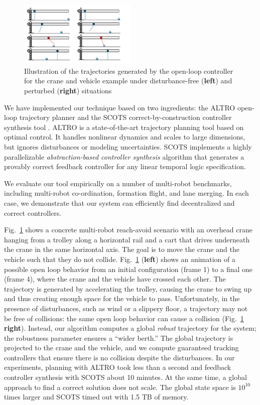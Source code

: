 \begin{figure}[t]
	\centering
	\includegraphics[width=0.5\textwidth]{figures/crane_and_forklifter.pdf}
	\caption{Illustration of the trajectories generated by the open-loop controller for the crane and vehicle example under disturbance-free (\textbf{left}) and perturbed (\textbf{right}) situations} 
	\label{fig:cr_and_lft}
\end{figure}




We have implemented our technique based on two ingredients: the ALTRO open-loop trajectory planner \cite{howell2019altro} and the 
SCOTS correct-by-construction controller synthesis tool \cite{Rungger2016scots}. 
ALTRO is a state-of-the-art trajectory planning tool based on optimal control.
It handles nonlinear dynamics and scales to large dimensions, but ignores disturbances or modeling uncertainties.
SCOTS implements a highly parallelizable \emph{abstraction-based controller synthesis} algorithm that generates a provably
correct feedback controller for any linear temporal logic specification.

We evaluate our tool empirically on a number of multi-robot benchmarks, including multi-robot co-ordination,
formation flight, and lane merging.
In each case, we demonstrate that our system can efficiently find decentralized and correct controllers.

Fig.~\ref{fig:cr_and_lft} shows a concrete multi-robot reach-avoid scenario with an overhead crane hanging from a trolley along a horizontal rail
and a cart that drives underneath the crane in the same horizontal axis.
The goal is to move the crane and the vehicle such that they do not collide.
Fig.~\ref{fig:cr_and_lft} (\textbf{left}) shows an animation of a possible open loop behavior from an initial configuration (frame 1) to a final
one (frame 4), where the crane and the vehicle have crossed each other.
The trajectory is generated by accelerating the trolley, causing the crane to swing up and thus creating enough space for the vehicle to pass.
Unfortunately, in the presence of disturbances, such as wind or a slippery floor, a trajectory may not be free of collisions: the same open loop
behavior can cause a collision (Fig.~\ref{fig:cr_and_lft} \textbf{right}).
Instead, our algorithm computes a global \emph{robust} trajectory for the system; the robustness parameter ensures a ``wider berth.''
The global trajectory is projected to the crane and the vehicle, and we compute guaranteed tracking controllers that ensure there is no collision despite the disturbances.
In our experiments, planning with ALTRO took less than a second and feedback controller synthesis with SCOTS about 10 minutes.
At the same time, a global approach to find a correct solution does not scale. 
The global state space is $10^{10}$ times larger and SCOTS timed out with 1.5 TB of memory. 


